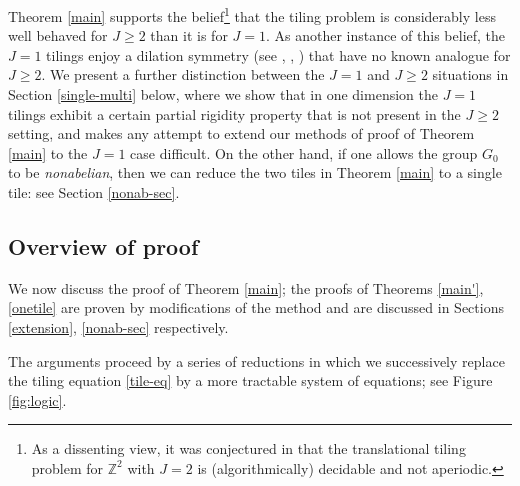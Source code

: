 \documentclass[reqno,a4paper,12pt]{amsart}
\numberwithin{equation}{section}
\numberwithin{figure}{section}
\def\Z{\mathbb{Z}}
\renewcommand\geq{\geqslant}
\theoremstyle{plain}
\theoremstyle{definition}
\begin{document}
Theorem \ref{main} supports the  belief\footnote{As a dissenting view, it was conjectured in \cite{gbn} that the translational tiling problem for $\Z^2$ with $J=2$ is (algorithmically) decidable and not aperiodic.} that the tiling problem is considerably less well behaved  for $J \geq 2$ than it is for $J=1$.  As another instance of this belief, the $J=1$ tilings enjoy a dilation symmetry (see \cite[Proposition 3.1]{BH}, \cite[Lemma 3.1]{GT}, \cite{tij}) that have no known analogue for $J \geq 2$.  We present a further distinction between the $J=1$ and $J \geq 2$ situations in Section \ref{single-multi} below, where we show that in one dimension the $J=1$ tilings exhibit a certain partial rigidity property that is not present in the $J \geq 2$ setting, and makes  any attempt to extend our methods of proof of Theorem \ref{main} to the $J=1$ case  difficult.  On the other hand, if one allows the group $G_0$ to be \emph{nonabelian}, then we can reduce the two tiles in Theorem \ref{main} to a single tile: see Section \ref{nonab-sec}.




\subsection{Overview of proof}

We now discuss the proof of Theorem \ref{main}; the proofs of Theorems \ref{main'}, \ref{onetile} are proven by modifications of the method and are discussed in Sections \ref{extension}, \ref{nonab-sec} respectively.

The arguments proceed by a series of reductions in which we successively replace the tiling equation \eqref{tile-eq} by a more tractable system of equations; see Figure \ref{fig:logic}.  
\end{document}
